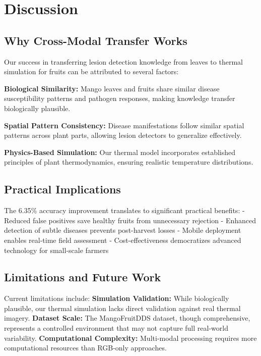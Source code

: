 \documentclass[conference]{IEEEtran}
\begin{document}
\section{Discussion}

\subsection{Why Cross-Modal Transfer Works}

Our success in transferring lesion detection knowledge from leaves to thermal simulation for fruits can be attributed to several factors:

\textbf{Biological Similarity:} Mango leaves and fruits share similar disease susceptibility patterns and pathogen responses, making knowledge transfer biologically plausible.

\textbf{Spatial Pattern Consistency:} Disease manifestations follow similar spatial patterns across plant parts, allowing lesion detectors to generalize effectively.

\textbf{Physics-Based Simulation:} Our thermal model incorporates established principles of plant thermodynamics, ensuring realistic temperature distributions.

\subsection{Practical Implications}

The 6.35\% accuracy improvement translates to significant practical benefits:
- Reduced false positives save healthy fruits from unnecessary rejection
- Enhanced detection of subtle diseases prevents post-harvest losses
- Mobile deployment enables real-time field assessment
- Cost-effectiveness democratizes advanced technology for small-scale farmers

\subsection{Limitations and Future Work}

Current limitations include:
\textbf{Simulation Validation:} While biologically plausible, our thermal simulation lacks direct validation against real thermal imagery.
\textbf{Dataset Scale:} The MangoFruitDDS dataset, though comprehensive, represents a controlled environment that may not capture full real-world variability.
\textbf{Computational Complexity:} Multi-modal processing requires more computational resources than RGB-only approaches.
\end{document}
